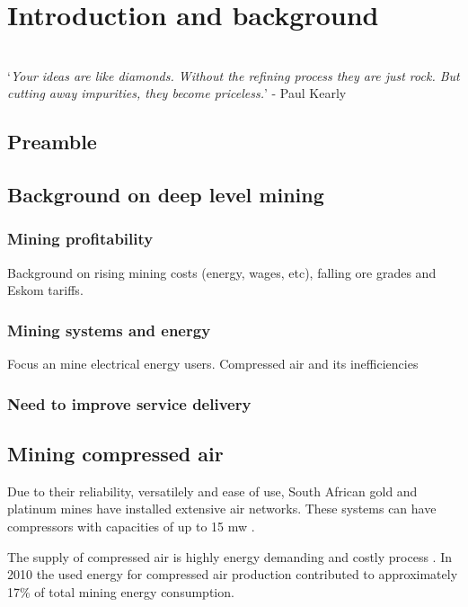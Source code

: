\chapter{Introduction and background}  %
\setcounter{page}{1}
\vspace{38em}

\hrulefill
\\
\enquote*{\textit{Your ideas are like diamonds. Without the refining process they are just rock. But cutting away impurities, they become priceless.}} - Paul Kearly\\
\newpage


\section{Preamble}

\section{Background on deep level mining}

\subsection{Mining profitability}
Background on rising mining costs (energy, wages, etc), falling ore grades and Eskom tariffs.\cite{neingo2016trends}
%	


\subsection{Mining systems and energy}
Focus an mine electrical energy users. Compressed air and its inefficiencies
\subsection{Need to improve service delivery}
\section{Mining compressed air}
Due to their reliability, versatilely and ease of use, South African gold and platinum mines have installed extensive air networks. These systems can have compressors with capacities of up to 15 \gls{mw} \cite{Marais2012PhD}.\par
The supply of compressed air is highly energy demanding and costly process \cite{padachi2009energy}.  In 2010 the used energy for compressed air production contributed to approximately 17\% of total mining energy consumption.\cite{Eskom2010Energy}

